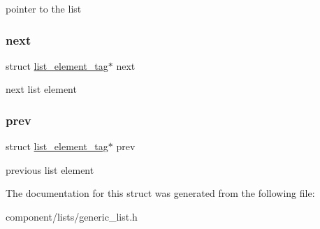 pointer to the list \mbox{\label{structlist__element__tag_a4620116f3b0b7da92291c039d1966b23}} 
\subsubsection{\texorpdfstring{next}{next}}
{\footnotesize\ttfamily struct \mbox{\hyperlink{structlist__element__tag}{list\+\_\+element\+\_\+tag}}$\ast$ next}

next list element \mbox{\label{structlist__element__tag_aadec3baa530680d7890f627cf882aa6d}} 
\subsubsection{\texorpdfstring{prev}{prev}}
{\footnotesize\ttfamily struct \mbox{\hyperlink{structlist__element__tag}{list\+\_\+element\+\_\+tag}}$\ast$ prev}

previous list element 

The documentation for this struct was generated from the following file\+:\begin{DoxyCompactItemize}
\item 
component/lists/generic\+\_\+list.\+h\end{DoxyCompactItemize}
